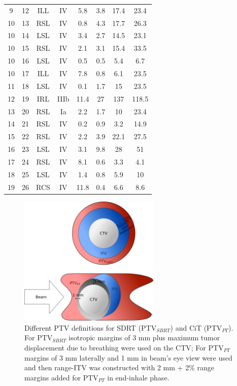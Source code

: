 \begin{table}[H]
\begin{tabular}{|c|c|c|c|c|c|c|c|}
    9 & 12 & ILL & IV & 5.8 & 3.8 & 17.4 & 23.4 \\
    10 & 13 & RSL & IV & 0.8 & 4.3 & 17.7 & 26.3 \\
    10 & 14 & LSL & IV & 3.4 & 2.7 & 14.5 & 23.1 \\
    10 & 15 & RSL & IV & 2.1 & 3.1 & 15.4 & 33.5 \\
    10 & 16 & LSL & IV & 0.5 & 0.5 & 5.4 & 6.7 \\
    10 & 17 & ILL & IV & 7.8 & 0.8 & 6.1 & 23.5 \\
    11 & 18 & LSL & IV & 0.1 & 1.7 & 15 & 23.5 \\
    12 & 19 & IRL & IIIb & 11.4 & 27 & 137 & 118.5 \\
    13 & 20 & RSL & Ia & 2.2 & 1.7 & 10 & 23.4 \\
    14 & 21 & RSL & IV & 0.2 & 0.9 & 3.2 & 14.9 \\
    15 & 22 & RSL & IV & 2.2 & 3.9 & 22.1 & 27.5 \\
    16 & 23 & LSL & IV & 3.1 & 9.8 & 28 & 51 \\
    17 & 24 & RSL & IV & 8.1 & 0.6 & 3.3 & 4.1 \\
    18 & 25 & LSL & IV & 1.4 & 0.8 & 5.9 & 10 \\
    19 & 26 & RCS & IV & 11.8 & 0.4 & 6.6 & 8.6 \\

    \hline\hline
  \end{tabular}
  \label{tab:patdata}
\end{table}
\newpage


\begin{figure}[H]
\begin{center}
\includegraphics[width=0.6\textwidth]{./PatientStudy/Images/Figure1.png}
\caption{Different PTV definitions for SDRT (PTV$_{SBRT}$) and CiT (PTV$_{PT}$). For PTV$_{SBRT}$ isotropic margins of 3 mm plus maximum tumor displacement due to 
breathing were used on the CTV; For PTV$_{PT}$ margins of 3 mm laterally and 1 mm in beam’s eye view were used and then range-ITV was constructed with
2 mm + 2\% range margins added for PTV$_{PT}$ in end-inhale phase.}
\label{Fig:PTV_def}
\end{center}
\end{figure}

